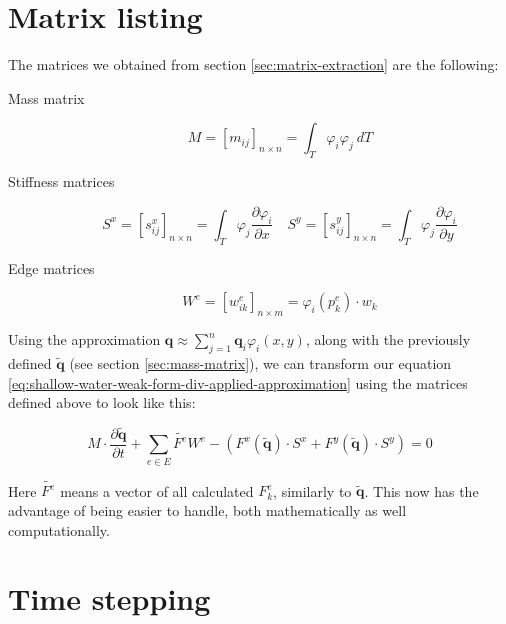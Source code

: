 \documentclass{article}
\newcommand{\pd}[2]{\dfrac{\partial #1}{\partial #2}}
\renewcommand{\phi}{\varphi}
\begin{document}
\section{Matrix listing}
\label{sec:matrix-listing}

The matrices we obtained from section \ref{sec:matrix-extraction} are the following:

\begin{description}
\item[Mass matrix]
  \begin{equation}
    \label{eq:mass-matrix}
    M = [m_{ij}]_{n \times n} = \int_T \phi_i \phi_j \ dT
  \end{equation}
\item[Stiffness matrices]
  \begin{equation}
    \label{eq:stiffness-matrix}
    S^x = [s_{ij}^x]_{n \times n} = \int_T \phi_j \pd{\phi_i}{x} \quad
    S^y = [s_{ij}^y]_{n \times n} = \int_T \phi_j \pd{\phi_i}{y}
  \end{equation}
\item[Edge matrices]
  \begin{equation}
    \label{eq:edge-matrix}
    W^e = [w_{ik}^e]_{n \times m} = \phi_i(p_k^e) \cdot w_k
  \end{equation}
\end{description}

Using the approximation $\mathbf{q} \approx \sum_{j=1}^n \mathbf{q}_i \phi_i\left(x,y\right)$, along with the previously defined $\tilde{\mathbf{q}}$ (see section \ref{sec:mass-matrix}), we can transform our equation \ref{eq:shallow-water-weak-form-div-applied-approximation} using the matrices defined above to look like this:

\begin{equation}
  \label{eq:swe-matrix-form}
  M \cdot \pd{\tilde{\mathbf{q}}}{t} +
  \sum_{e \in E} \tilde{F^e} W^e -
  \left(F^x(\tilde{\mathbf{q}}) \cdot S^x +
    F^y(\tilde{\mathbf{q}}) \cdot S^y\right) = 0
\end{equation}

Here $\tilde{F^e}$ means a vector of all calculated $F_k^e$, similarly to $\tilde{\mathbf{q}}$. This now has the advantage of being easier to handle, both mathematically as well computationally.

\section{Time stepping}
\label{sec:computing-integrals}
\end{document}
